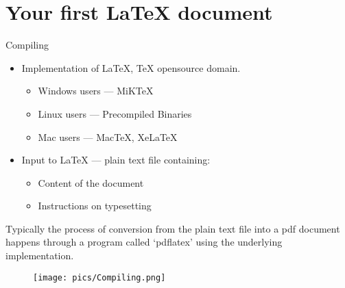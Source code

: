 \documentclass{beamer}
\begin{document}
\section{Your first \LaTeX{} document}

\begin{frame}[fragile]{Compiling}

\begin{itemize}
  \item Implementation of \LaTeX{}, \TeX{} opensource domain. 
  \begin{itemize}
  \item Windows users --- MiK\TeX 
  \item Linux users --- Precompiled Binaries
  \item Mac users --- Mac\TeX{}, Xe\LaTeX
  \end{itemize}
\end{itemize}
\begin{itemize}
 \item Input to \LaTeX{} --- plain text file containing:
 \begin{itemize}
 \item Content of the document
 \item Instructions on typesetting
 \end{itemize}
\end{itemize}
Typically the process of conversion from the plain text file into a pdf 
document happens through a program called `pdflatex' using the underlying 
implementation.
 \begin{figure}
  \centering
  \texttt{[image: pics/Compiling.png]}
 \end{figure}
\end{frame}
\end{document}
